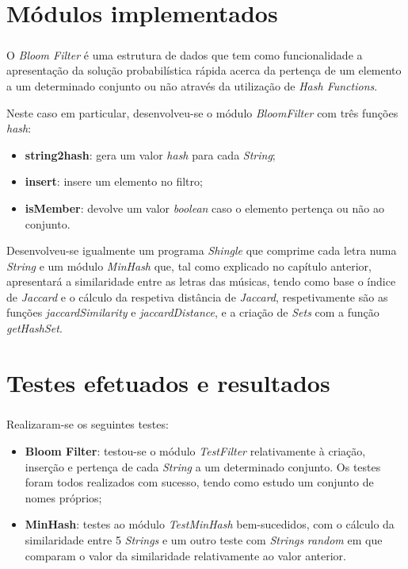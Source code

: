 \documentclass{report}
\begin{document}
\chapter{Módulos implementados}
\label{chap.modulos}

\paragraph{}
O \textit{Bloom Filter} é uma estrutura de dados que tem como funcionalidade a apresentação da solução probabilística rápida acerca da pertença de um elemento a um determinado conjunto ou não através da utilização de \textit{Hash Functions}.

Neste caso em particular, desenvolveu-se o módulo \textit{BloomFilter} com três funções \textit{hash}:
\begin{itemize}
	\item \textbf{string2hash}: gera um valor \textit{hash} para cada \textit{String};
	\item \textbf{insert}: insere um elemento no filtro;
	\item \textbf{isMember}: devolve um valor \textit{boolean} caso o elemento pertença ou não ao conjunto.
\end{itemize}

Desenvolveu-se igualmente um programa \textit{Shingle} que comprime cada letra numa \textit{String} e um módulo \textit{MinHash} que, tal como explicado no capítulo anterior, apresentará a similaridade entre as letras das músicas, tendo como base o índice de \textit{Jaccard} e o cálculo da respetiva distância de \textit{Jaccard}, respetivamente são as funções \textit{jaccardSimilarity} e \textit{jaccardDistance}, e a criação de \textit{Sets} com a função \textit{getHashSet}.


\chapter{Testes efetuados e resultados}
\label{chap.testes}

\paragraph{} 
Realizaram-se os seguintes testes:

\begin{itemize}
	\item \textbf{Bloom Filter}: testou-se o módulo \textit{TestFilter} relativamente à criação, inserção e pertença de cada \textit{String} a um determinado conjunto. Os testes foram todos realizados com sucesso, tendo como estudo um conjunto de nomes próprios;
	\item \textbf{MinHash}: testes ao módulo \textit{TestMinHash} bem-sucedidos, com o cálculo da similaridade entre 5 \textit{Strings} e um outro teste com \textit{Strings} \textit{random} em que comparam o valor da similaridade relativamente ao valor anterior.
\end{itemize}
\end{document}
